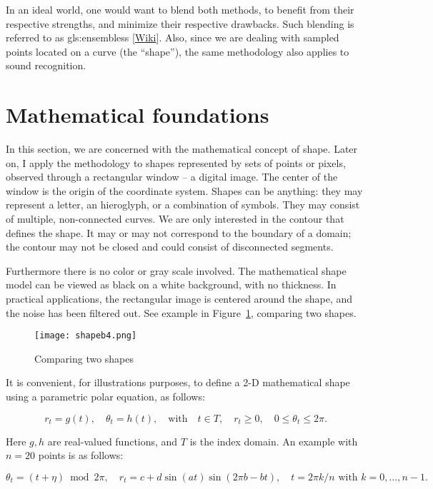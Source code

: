 \documentclass[oneside,10pt]{book}
\begin{document}
In an ideal world, one would want to blend both methods, to benefit from their respective strengths, and minimize their respective drawbacks. Such blending is referred to as \glspl{gls:ensembles} [\href{https://en.wikipedia.org/wiki/Ensemble_learning}{Wiki}]. Also, since we are dealing with sampled points located on a curve (the “shape”), the same methodology also applies to sound recognition.

\section{Mathematical foundations}

In this section, we are concerned with the mathematical concept of shape. Later on, I apply the methodology to shapes represented by sets of points or pixels, observed through a rectangular window -- a digital image. The center of the window is the origin of the coordinate system. Shapes can be anything: they may represent a letter, an hieroglyph, or a combination of symbols. They may consist of multiple, non-connected curves. We are only interested in the contour that defines the shape. It may or may not correspond to the boundary of a domain; the contour may not be closed and could consist of disconnected segments.

Furthermore there is no color or gray scale involved. The mathematical shape model can be viewed as black on a white background, with no thickness. In practical applications, the rectangular image is centered around the shape, and the noise has been filtered out. See example in Figure~\ref{fig:dash}, comparing two shapes.

\begin{figure}%
\centering
\texttt{[image: shapeb4.png]} %
\caption{Comparing two shapes}
\label{fig:dash}
\end{figure}


\noindent It is convenient, for illustrations purposes, to define a 2-D mathematical shape using a parametric polar equation, as follows:

$$r_t =g(t), \quad\theta_t=h(t),  \quad \text{with}\quad  t\in T, \quad r_t\geq 0, \quad 0\leq \theta_t\leq 2\pi.$$

\noindent Here $g, h$ are real-valued functions, and $T$ is the index domain. An example with $n= 20$ points is as follows: 

\begin{equation}
\theta_t=(t+\eta)\bmod{2\pi},\quad r_t=c+d \sin(at) \sin(2\pi b- bt), \quad t = 2\pi k/n \text{ with } k=0,\dots, n-1. \label{eq2}
\end{equation}
\end{document}
